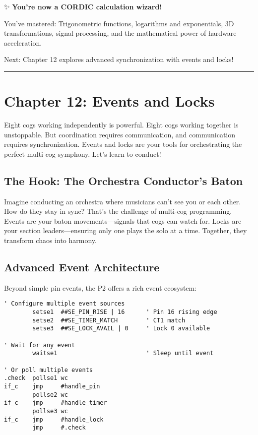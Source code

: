 \documentclass[11pt]{book}
\begin{document}
\begin{chapterend}
✨ \textbf{You're now a CORDIC calculation wizard!}

You've mastered: Trigonometric functions, logarithms and exponentials, 3D transformations, signal processing, and the mathematical power of hardware acceleration.

Next: Chapter 12 explores advanced synchronization with events and locks!
\end{chapterend}

\begin{center}\rule{0.5\linewidth}{0.5pt}\end{center}

\hypertarget{chapter-12-events-and-locks}{%
\section{Chapter 12: Events and
Locks}\label{chapter-12-events-and-locks}}

Eight cogs working independently is powerful. Eight cogs working
together is unstoppable. But coordination requires communication, and
communication requires synchronization. Events and locks are your tools
for orchestrating the perfect multi-cog symphony. Let's learn to
conduct!

\hypertarget{the-hook-the-orchestra-conductors-baton}{%
\subsection{The Hook: The Orchestra Conductor's
Baton}\label{the-hook-the-orchestra-conductors-baton}}

Imagine conducting an orchestra where musicians can't see you or each
other. How do they stay in sync? That's the challenge of multi-cog
programming. Events are your baton movements---signals that cogs can
watch for. Locks are your section leaders---ensuring only one plays the
solo at a time. Together, they transform chaos into harmony.

\hypertarget{advanced-event-architecture}{%
\subsection{Advanced Event
Architecture}\label{advanced-event-architecture}}

Beyond simple pin events, the P2 offers a rich event ecosystem:

\begin{lstlisting}
' Configure multiple event sources
        setse1  ##SE_PIN_RISE | 16      ' Pin 16 rising edge
        setse2  ##SE_TIMER_MATCH        ' CT1 match
        setse3  ##SE_LOCK_AVAIL | 0     ' Lock 0 available
        
' Wait for any event
        waitse1                         ' Sleep until event
        
' Or poll multiple events
.check  pollse1 wc
if_c    jmp     #handle_pin
        pollse2 wc
if_c    jmp     #handle_timer
        pollse3 wc
if_c    jmp     #handle_lock
        jmp     #.check
\end{lstlisting}
\end{document}
